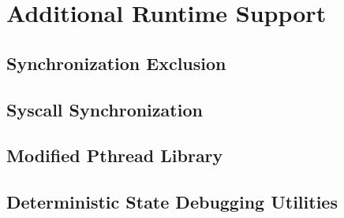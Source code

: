 \chapter{Additional Runtime Support}
\section{Synchronization Exclusion}
\section{Syscall Synchronization}
\section{Modified Pthread Library}
\section{Deterministic State Debugging Utilities}